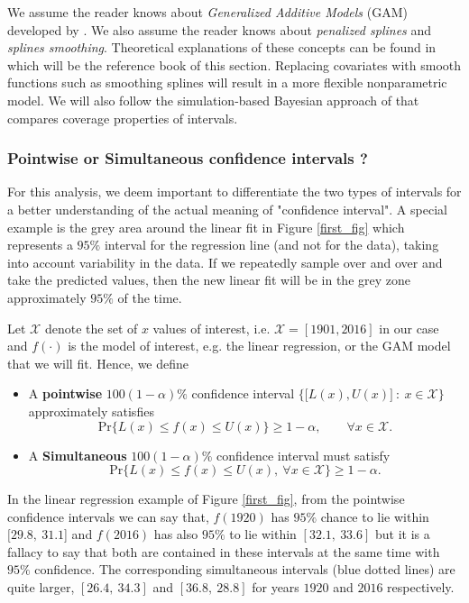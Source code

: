 We assume the reader knows about \emph{Generalized Additive Models} (GAM) developed by \citet{hastie_generalized_1986}. We also assume the reader knows about \emph{penalized splines} and \emph{splines smoothing}. Theoretical explanations of these concepts can be found in \citet[chapter 3, 6 and 11]{ruppert_semiparametric_2003} which will be the reference book of this section. Replacing covariates with smooth functions such as smoothing splines will result in a more flexible nonparametric model. We will also follow the simulation-based Bayesian approach of \citet{marra_coverage_2012} that compares coverage properties of intervals.


\subsubsection*{Pointwise or Simultaneous confidence intervals ?}

For this analysis, we deem important to differentiate the two types of intervals for a better understanding of the actual meaning of "confidence interval". A special example is the grey area around the linear fit in Figure \ref{first_fig} which represents a $95\%$ interval for the regression line (and not for the data), taking into account variability in the data. If we repeatedly sample over and over and take the predicted values, then the new linear fit will be in the grey zone approximately $95\%$ of the time.

Let $\mathcal{X}$ denote the set of $x$ values of interest, i.e. $\mathcal{X}=[1901,2016]$ in our case and $f(\cdot)$ is the model of interest, e.g. the linear regression, or the GAM model that we will fit. Hence, we define 
\begin{itemize}
	\item A \textbf{pointwise} $100(1-\alpha)\%$ confidence interval $\Big\{\big[L(x),U(x)\big] \ : \ x\in \mathcal{X}\Big\}$ approximately satisfies
	\begin{equation}
	\text{Pr}\Big\{L(x)\leq f(x)\leq U(x)\Big\}\geq 1-\alpha, \qquad \forall x\in\mathcal{X}.
	\end{equation}
	
	\item A \textbf{Simultaneous} $100(1-\alpha)\%$ confidence interval must satisfy 
	\begin{equation}
	\text{Pr}\Big\{L(x)\leq f(x)\leq U(x), \ \forall x\in\mathcal{X}\Big\}\geq 1-\alpha.
	\end{equation}
\end{itemize} 
In the linear regression example of Figure \ref{first_fig}, from the pointwise confidence intervals we can say that, $f(1920)$ has $95\%$ chance to lie within $[29.8,\ 31.1$] and $f(2016)$ has also $95\%$ to lie within $[32.1, \ 33.6]$ but it is a fallacy to say that both are contained in these intervals at the same time with $95\%$ confidence. The corresponding simultaneous intervals (blue dotted lines) are quite larger, $[26.4, \ 34.3]$ and $[36.8, \ 28.8]$ for years $1920$ and $2016$ respectively.

